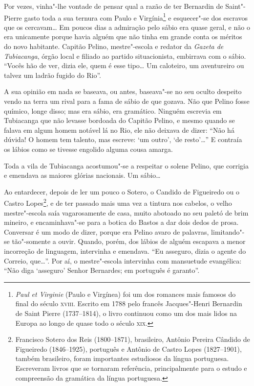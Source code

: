 Por vezes, vinha"-lhe vontade de pensar qual a razão de ter Bernardin de
Saint"-Pierre gasto toda a sua ternura com Paulo e Virgínia\footnote{\emph{Paul
  et Virginie} (Paulo e Virgínea) foi um dos romances mais famosos do
  final do século \textsc{xviii}. Escrito em 1788 pelo francês Jacques"-Henri
  Bernardin de Saint Pierre (1737--1814), o livro continuou como um
  dos mais lidos na Europa ao longo de quase todo o século \textsc{xix}.} e
esquecer"-se dos escravos que os cercavam\ldots{} Em poucos dias a admiração
pelo sábio era quase geral, e não o era unicamente porque havia alguém
que não tinha em grande conta os méritos do novo habitante. Capitão
Pelino, mestre"-escola e redator da \emph{Gazeta de Tubiacanga}, órgão
local e filiado ao partido situacionista, embirrava com o sábio. ``Vocês
hão de ver, dizia ele, quem é esse tipo\ldots{} Um caloteiro, um aventureiro
ou talvez um ladrão fugido do Rio''.

A sua opinião em nada se baseava, ou antes, baseava"-se no seu oculto
despeito vendo na terra um rival para a fama de sábio de que gozava. Não
que Pelino fosse químico, longe disso; mas era sábio, era gramático.
Ninguém escrevia em Tubiacanga que não levasse bordoada do Capitão
Pelino, e mesmo quando se falava em algum homem notável lá no Rio, ele
não deixava de dizer: ``Não há dúvida! O homem tem talento, mas escreve:
`um outro', `de resto'\ldots{}'' E contraía os lábios como se tivesse engolido
alguma cousa amarga.

Toda a vila de Tubiacanga acostumou"-se a respeitar o solene Pelino, que
corrigia e emendava as maiores glórias nacionais. Um sábio\ldots{}

Ao entardecer, depois de ler um pouco o Sotero, o Candido de Figueiredo
ou o Castro Lopes\footnote{Francisco Sotero dos Reis (1800--1871),
  brasileiro, Antônio Pereira Cândido de Figueiredo (1846--1925),
  português e Antônio de Castro Lopes (1827--1901), também brasileiro,
  foram importantes estudiosos da língua portuguesa. Escreveram livros
  que se tornaram referência, principalmente para o estudo e compreensão
  da gramática da língua portuguesa.}, e de ter passado mais uma vez a
tintura nos cabelos, o velho mestre"-escola saía vagarosamente de casa,
muito abotoado no seu paletó de brim mineiro, e encaminhava"-se para a
botica do Bastos a dar dois dedos de prosa. Conversar é um modo de
dizer, porque era Pelino avaro de palavras, limitando"-se tão"-somente a
ouvir. Quando, porém, dos lábios de alguém escapava a menor incorreção
de linguagem, intervinha e emendava. ``Eu asseguro, dizia o agente do
Correio, que\ldots{}''. Por aí, o mestre"-escola intervinha com mansuetude
evangélica: ``Não diga `asseguro' Senhor Bernardes; em português é
garanto''.


